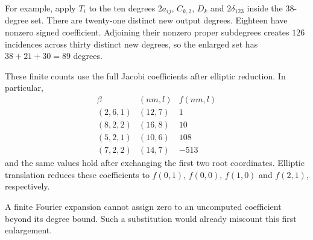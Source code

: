 For example, apply $T_i$ to the ten degrees
$2a_{ij}$, $C_{k,2}$, $D_k$ and $2\delta_{123}$ inside the
$38$-degree set. There are twenty-one distinct new output degrees.
Eighteen have nonzero signed coefficient. Adjoining their nonzero
proper subdegrees creates $126$ incidences across thirty distinct
new degrees, so the enlarged set has $38+21+30=89$ degrees.

These finite counts use the full Jacobi coefficients after elliptic
reduction. In particular,
\[
 \begin{array}{c|c|r}
 \beta&(n m,l)&f(nm,l)\\\hline
 (2,6,1)&(12,7)&1\\
 (8,2,2)&(16,8)&10\\
 (5,2,1)&(10,6)&108\\
 (7,2,2)&(14,7)&-513
 \end{array}
\]
and the same values hold after exchanging the first two root
coordinates. Elliptic translation reduces these coefficients to
$f(0,1)$, $f(0,0)$, $f(1,0)$ and $f(2,1)$, respectively.

A finite Fourier expansion cannot assign zero to an uncomputed
coefficient beyond its degree bound. Such a substitution would
already miscount this first enlargement.

